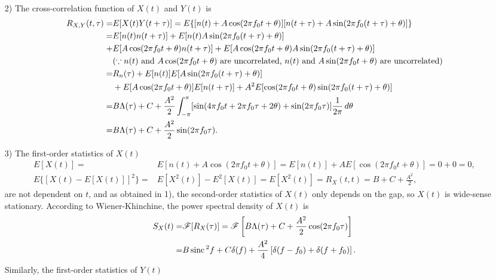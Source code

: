 \documentclass{assignment}
\begin{document}
\begin{sol}
\begin{itemize}
\begin{align}
        \end{align}
        \item[2)] The cross-correlation function of $X(t)$ and $Y(t)$ is
        \begin{align}
            \notag R_{X,Y}(t,\tau)=&E[X(t)Y(t+\tau)]=E\{[n(t)+A\cos(2\pi f_0t+\theta)][n(t+\tau)+A\sin(2\pi f_0(t+\tau)+\theta)]\}\\
            \notag=&E[n(t)n(t+\tau)]+E[n(t)A\sin(2\pi f_0(t+\tau)+\theta)]\\
            \notag+&E[A\cos(2\pi f_0t+\theta)n(t+\tau)]+E[A\cos(2\pi f_0t+\theta)A\sin(2\pi f_0(t+\tau)+\theta)]\\
            \notag&(\because n(t)\text{ and }A\cos(2\pi f_0t+\theta)\text{ are uncorrelated, }n(t)\text{ and }A\sin(2\pi f_0t+\theta)\text{ are uncorrelated})\\
            \notag=&R_n(\tau)+E[n(t)]E[A\sin(2\pi f_0(t+\tau)+\theta)]\\
            \notag&+E[A\cos(2\pi f_0t+\theta)]E[n(t+\tau)]+A^2E[\cos(2\pi f_0t+\theta)\sin(2\pi f_0(t+\tau)+\theta)]\\
            \notag=&B\Lambda(\tau)+C+\frac{A^2}{2}\int_{-\pi}^{\pi}[\sin(4\pi f_0t+2\pi f_0\tau+2\theta)+\sin(2\pi f_0\tau)]\frac{1}{2\pi}\,d\theta\\
            =&B\Lambda(\tau)+C+\frac{A^2}{2}\sin(2\pi f_0\tau).
        \end{align}
        \item[3)] The first-order statistics of $X(t)$
        \begin{align}
            E[X(t)]=&E[n(t)+A\cos(2\pi f_0t+\theta)]=E[n(t)]+AE[\cos(2\pi f_0t+\theta)]=0+0=0,\\
            E\{[X(t)-E[X(t)]]^2\}=&E[X^2(t)]-E^2[X(t)]=E[X^2(t)]=R_X(t,t)=B+C+\frac{A^2}{2},
        \end{align}
        are not dependent on $t$, and as obtained in 1), the second-order statistics of $X(t)$ only depends on the gap, so $X(t)$ is wide-sense stationary. According to Wiener-Khinchine, the power spectral density of $X(t)$ is
        \begin{align}
            \notag S_X(t)=&\mathscr{F}[R_X(\tau)]=\mathscr{F}\left[B\Lambda(\tau)+C+\frac{A^2}{2}\cos(2\pi f_0\tau)\right]\\
            =&B\,\text{sinc}\,^2f+C\delta(f)+\frac{A^2}{4}\left[\delta(f-f_0)+\delta(f+f_0)\right].
        \end{align}
        Similarly, the first-order statistics of $Y(t)$
        \begin{align}

\end{align}
\end{itemize}
\end{sol}
\end{document}

